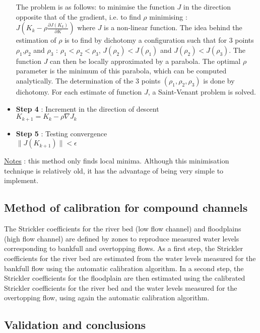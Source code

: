\begin{itemize}
    The problem is as follows: to minimise the function $J$ in the direction opposite that of the gradient, i.e. to find $\rho$ minimising : \\
    $J \left ( K_k - \rho \frac{\partial J(K_k)}{\partial K} \right )$ where $J$ is a non-linear function.
    The idea behind the estimation of $\rho$ is to find by dichotomy a configuration such that for 3 points $\rho_1$,$\rho_2$ and $\rho_3$ : $\rho_1<\rho_2<\rho_3$, $J(\rho_2)<J(\rho_1)$ and $J(\rho_2)<J(\rho_3)$.
    The function $J$ can then be locally approximated by a parabola. The optimal $\rho$ parameter is the minimum of this parabola, which can be computed analytically.
    The determination of the 3 points $(\rho_1,\rho_2,\rho_3)$ is done by dichotomy. For each estimate of function $J$, a Saint-Venant problem is solved.
  \item \textbf{Step 4} : Increment in the direction of descent \\
    $K_{k+1} = K_{k} - \rho \nabla J_{k}$
  \item \textbf{Step 5} : Testing convergence \\
    $\| J(K_{k+1}) \|< \epsilon$
\end{itemize}

\vspace{0.5cm}

\underline{Notes} : this method only finds local minima. Although this minimisation technique is relatively old, it has the advantage of being very simple to implement.

\subsection{Method of calibration for compound channels}

The Strickler coefficients for the river bed (low flow channel) and floodplains (high flow channel) are defined by zones to reproduce measured water levels corresponding to bankfull and overtopping flows. As a first step, the Strickler coefficients for the river bed are estimated from the water levels measured for the bankfull flow using the automatic calibration algorithm. In a second step, the Strickler coefficients for the floodplain are then estimated using the calibrated Strickler coefficients for the river bed and the water levels measured for the overtopping flow, using again the automatic calibration algorithm.

\subsection{Validation and conclusions}

